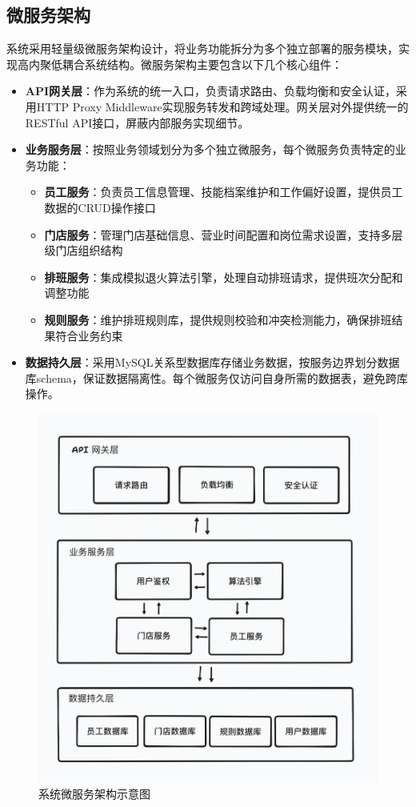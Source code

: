 \documentclass{ctexart}
\begin{document}
\subsection{微服务架构}
系统采用轻量级微服务架构设计，将业务功能拆分为多个独立部署的服务模块，实现高内聚低耦合系统结构。微服务架构主要包含以下几个核心组件：

\begin{itemize}
    \item \textbf{API网关层}：作为系统的统一入口，负责请求路由、负载均衡和安全认证，采用HTTP Proxy Middleware实现服务转发和跨域处理。网关层对外提供统一的RESTful API接口，屏蔽内部服务实现细节。
    
    \item \textbf{业务服务层}：按照业务领域划分为多个独立微服务，每个微服务负责特定的业务功能：
    \begin{itemize}
        \item \textbf{员工服务}：负责员工信息管理、技能档案维护和工作偏好设置，提供员工数据的CRUD操作接口
        \item \textbf{门店服务}：管理门店基础信息、营业时间配置和岗位需求设置，支持多层级门店组织结构
        \item \textbf{排班服务}：集成模拟退火算法引擎，处理自动排班请求，提供班次分配和调整功能
        \item \textbf{规则服务}：维护排班规则库，提供规则校验和冲突检测能力，确保排班结果符合业务约束
    \end{itemize}
    
    \item \textbf{数据持久层}：采用MySQL关系型数据库存储业务数据，按服务边界划分数据库schema，保证数据隔离性。每个微服务仅访问自身所需的数据表，避免跨库操作。
    
\end{itemize}

\begin{figure}[H]
    \centering
    \includegraphics[width=0.8\linewidth]{./source/微服务架构图.png}
    \caption{系统微服务架构示意图}
    \label{fig:microservice-arch}
\end{figure}
\end{document}
